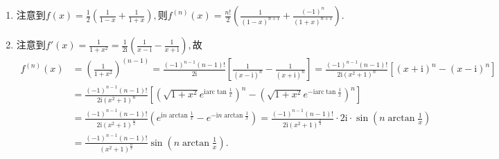 \documentclass[../../main.tex]{subfiles}%
\begin{document}
\begin{solution}
\begin{enumerate}[(1)]
\item 注意到$f\left( x \right) =\frac{1}{2}\left( \frac{1}{1-x}+\frac{1}{1+x} \right) ,$则$f^{\left( n \right)}\left( x \right) =\frac{n!}{2}\left( \frac{1}{\left( 1-x \right) ^{n+1}}+\frac{\left( -1 \right) ^n}{\left( 1+x \right) ^{n+1}} \right) .$

\item 注意到$f' \left( x \right) =\frac{1}{1+x^2}=\frac{1}{2\mathrm{i}}\left( \frac{1}{x-\mathrm{i}}-\frac{1}{x+\mathrm{i}} \right) ,$故
\begin{align*}
f^{\left( n \right)}\left( x \right) &=\left( \frac{1}{1+x^2} \right) ^{\left( n-1 \right)}=\frac{\left( -1 \right) ^{n-1}\left( n-1 \right) !}{2\mathrm{i}}\left[ \frac{1}{\left( x-\mathrm{i} \right) ^n}-\frac{1}{\left( x+\mathrm{i} \right) ^{n}} \right] =\frac{\left( -1 \right) ^{n-1}\left( n-1 \right) !}{2\mathrm{i}\left( x^2+1 \right) ^{n}}\left[ \left( x+\mathrm{i} \right) ^{n}-\left( x-\mathrm{i} \right) ^n \right] 
\\
&=\frac{\left( -1 \right) ^{n-1}\left( n-1 \right) !}{2\mathrm{i}\left( x^2+1 \right) ^{n}}\left[ \left( \sqrt{1+x^2}e^{\mathrm{iarc}\tan \frac{1}{x}} \right) ^{n}-\left( \sqrt{1+x^2}e^{-\mathrm{iarc}\tan \frac{1}{x}} \right) ^n \right] 
\\
&=\frac{\left( -1 \right) ^{n-1}\left( n-1 \right) !}{2\mathrm{i}\left( x^2+1 \right) ^{\frac{n}{2}}}\left( e^{\mathrm{i}n\arctan  \frac{1}{x}}-e^{-\mathrm{i}n\arctan  \frac{1}{x}} \right) =\frac{\left( -1 \right) ^{n-1}\left( n-1 \right) !}{2\mathrm{i}\left( x^2+1 \right) ^{\frac{n}{2}}}\cdot 2\mathrm{i}\cdot \sin \left( n\arctan  \frac{1}{x} \right) 
\\
&=\frac{\left( -1 \right) ^{n-1}\left( n-1 \right) !}{\left( x^2+1 \right) ^{\frac{n}{2}}}\sin \left( n\arctan  \frac{1}{x} \right) .
\end{align*}
\end{enumerate}

\end{solution}
\end{document}
